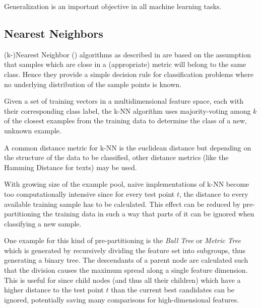 		Generalization is an important objective in all machine learning tasks. 
		
				\subsection{Nearest Neighbors}
		(k-)Nearest Neighbor () algorithms as described in \cite{Cover1967, Fix1952} are based on the assumption that samples which are close in a (appropriate) metric will belong to the same class. Hence they provide a simple decision rule for classification problems where no underlying distribution of the sample points is known. 
		
		Given a set of training vectors in a multidimensional feature space, each with their corresponding class label, the k-NN algorithm uses majority-voting among $k$ of the closest examples from the training data to determine the class of a new, unknown example.
		
		A common distance metric for k-NN is the euclidean distance but depending on the structure of the data to be classified, other distance metrics (like the Hamming Distance for texts) may be used.
		
		With growing size of the example pool, naive implementations of k-NN become too computationally intensive since for every test point $t$, the distance to every available training sample has to be calculated. This effect can be reduced by pre-partitioning the training data in such a way that parts of it can be ignored when classifying a new sample. 
		
		One example for this kind of pre-partitioning is the \textit{Ball Tree} or \textit{Metric Tree} which is generated by recursively dividing the feature set into subgroups, thus generating a binary tree. The descendants of a parent node are calculated such that the division causes the maximum spread along a single feature dimension. This is useful for  since child nodes (and thus all their children) which have a higher distance to the test point $t$ than the current best candidates can be ignored, potentially saving many comparisons for high-dimensional features.
		
		\begin{figure}
			\centering
			\fontsize{7.5pt}{11pt}\selectfont%
			\begin{subfigure}[c]{0.4\textwidth}
				\centering
				\def\svgwidth{\textwidth}
				
			\end{subfigure}
			\begin{subfigure}[c]{0.4\textwidth}
				\centering
				\def\svgwidth{\textwidth}
				
			\end{subfigure}
			\caption{}
			\label{fig:simpleperceptron}
		\end{figure}
		
